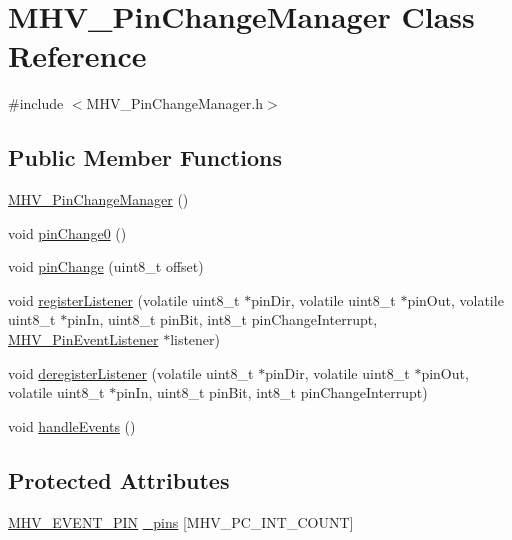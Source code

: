 \hypertarget{class_m_h_v___pin_change_manager}{
\section{\-M\-H\-V\-\_\-\-Pin\-Change\-Manager \-Class \-Reference}
\label{class_m_h_v___pin_change_manager}
}


{\ttfamily \#include $<$\-M\-H\-V\-\_\-\-Pin\-Change\-Manager.\-h$>$}

\subsection*{\-Public \-Member \-Functions}
\begin{DoxyCompactItemize}
\item 
\hyperlink{class_m_h_v___pin_change_manager_a0f53c32cf969c858e7c0f5127f8ed760}{\-M\-H\-V\-\_\-\-Pin\-Change\-Manager} ()
\item 
void \hyperlink{class_m_h_v___pin_change_manager_a2e13f1107ef9406dd224f404176e4fde}{pin\-Change0} ()
\item 
void \hyperlink{class_m_h_v___pin_change_manager_af607081980ab2858f718f6ed0ae0f9f1}{pin\-Change} (uint8\-\_\-t offset)
\item 
void \hyperlink{class_m_h_v___pin_change_manager_a62db8a613954f815542ac81e33d482bd}{register\-Listener} (volatile uint8\-\_\-t $\ast$pin\-Dir, volatile uint8\-\_\-t $\ast$pin\-Out, volatile uint8\-\_\-t $\ast$pin\-In, uint8\-\_\-t pin\-Bit, int8\-\_\-t pin\-Change\-Interrupt, \hyperlink{class_m_h_v___pin_event_listener}{\-M\-H\-V\-\_\-\-Pin\-Event\-Listener} $\ast$listener)
\item 
void \hyperlink{class_m_h_v___pin_change_manager_ae4ca58d0c791dc7223d38d09e1b1b885}{deregister\-Listener} (volatile uint8\-\_\-t $\ast$pin\-Dir, volatile uint8\-\_\-t $\ast$pin\-Out, volatile uint8\-\_\-t $\ast$pin\-In, uint8\-\_\-t pin\-Bit, int8\-\_\-t pin\-Change\-Interrupt)
\item 
void \hyperlink{class_m_h_v___pin_change_manager_a241ab368e927b544737adadc2c4b45d0}{handle\-Events} ()
\end{DoxyCompactItemize}
\subsection*{\-Protected \-Attributes}
\begin{DoxyCompactItemize}
\item 
\hyperlink{_m_h_v___pin_change_manager_8h_a8690da5e1dbb6f0cb21bdb56a4982a66}{\-M\-H\-V\-\_\-\-E\-V\-E\-N\-T\-\_\-\-P\-I\-N} \hyperlink{class_m_h_v___pin_change_manager_afe6febbf14bb802401734219ef6b2eec}{\-\_\-pins} \mbox{[}\-M\-H\-V\-\_\-\-P\-C\-\_\-\-I\-N\-T\-\_\-\-C\-O\-U\-N\-T\mbox{]}
\end{DoxyCompactItemize}


